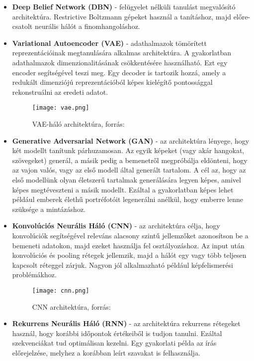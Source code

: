 \begin{itemize}
 \item \textbf{Deep Belief Network (DBN)} - felügyelet nélküli tanulást megvalósító architektúra. Restrictive Boltzmann gépeket használ a tanításhoz, majd előre-csatolt neurális hálót a finomhangoláshoz.
 \item \textbf{Variational Autoencoder (VAE)} - adathalmazok tömörített reprezentációinak megtanulására alkalmas architektúra. A gyakorlatban adathalmazok dimenzionalitásának csökkentésére használható. Ezt egy encoder segítségével teszi meg. Egy decoder is tartozik hozzá, amely a redukált dimenziójú reprezentációból képes kielégítő pontossággal rekonstruálni az eredeti adatot.
\begin{figure}[H]
  \centering
  \texttt{[image: vae.png]}
  \caption{VAE-háló architektúra, forrás: \cite{deeplearningbook}}
\end{figure}
 \item \textbf{Generative Adversarial Network (GAN)} - az architektúra lényege, hogy két modellt tanítunk párhuzamosan. Az egyik képeket (vagy akár hangokat, szövegeket) generál, a másik pedig a bemenetről megpróbálja eldönteni, hogy az vajon valós, vagy az első modell által generált tartalom. A cél az, hogy az első modellünk olyan életszerű tartalmak generálására legyen képes, amivel képes megtéveszteni a másik modellt. Ezáltal a gyakorlatban képes lehet például emberek élethű portréfotóit legenerálni anélkül, hogy emberre lenne szüksége a mintázáshoz.
 \item \textbf{Konvolúciós Neurális Háló (CNN)} - az architektúra célja, hogy konvolúciók segítségével releváns alacsony szintű jellemzőket azonosítson be a bemeneti adatokon, majd ezeket használja fel osztályozáshoz. Az input után konvolúciós és pooling rétegek jellemzik, majd a hálót egy vagy több teljesen kapcsolt réteggel zárjuk. Nagyon jól alkalmazható például képfelismerési problémákhoz.
 \begin{figure}[H]
  \centering
  \texttt{[image: cnn.png]}
  \caption{CNN architektúra, forrás: \cite{deeplearningbook}}
\end{figure}
 \item \textbf{Rekurrens Neurális Háló (RNN)} - az architektúra rekurrens rétegeket használ, hogy korábbi időpontok értékeiből is tudjon tanulni. Ezáltal szekvenciákat tud optimálisan kezelni. Egy gyakorlati példa az írás előrejelzése, melyhez a korábban leírt szavakat is felhasználja. \cite{deeplearningbook}
\end{itemize}